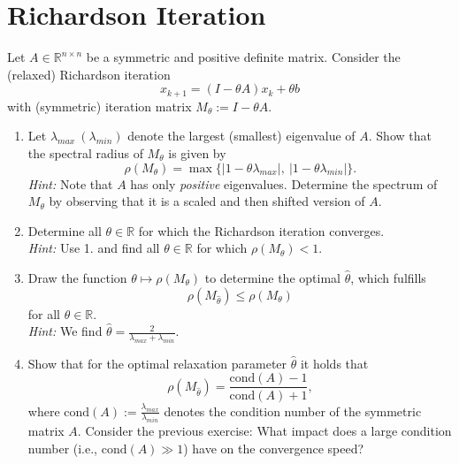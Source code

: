 \section{Richardson Iteration}
Let $A \in \mathbb{R}^{n\times n}$ be a symmetric and positive definite matrix.  Consider the (relaxed) Richardson iteration 
$$x_{k+1} = (I -  \theta A)x_k + \theta b $$
with (symmetric) iteration matrix $M_\theta := I-\theta A$.
\begin{enumerate}
	\item Let $\lambda_{max} ~(\lambda_{min})$ denote the largest (smallest) eigenvalue of $A$. Show that the spectral radius of $M_\theta$ is given by  $$\rho(M_\theta) = \max\{|1 - \theta \lambda_{max}|, ~|1 - \theta \lambda_{min}|\}.$$ 
	\textit{Hint:} Note that $A$ has only \textit{positive} eigenvalues. Determine the spectrum of $M_\theta$ by observing that it is a scaled and then shifted version of $A$.
	\item  Determine all $\theta \in \mathbb{R}$ for which the Richardson iteration converges.\\[0.1cm]
	\textit{Hint:} Use 1. and find all $\theta \in \mathbb{R}$ for which $\rho(M_\theta) < 1$.
	\item Draw the function $\theta \mapsto \rho(M_\theta)$ to determine the optimal $\hat{\theta}$, which fulfills
	$$\rho(M_{\hat{\theta}}) \leq  \rho(M_{\theta})$$
	for all $\theta \in \mathbb{R}$. \\[0.1cm]
	\textit{Hint: } We find $\hat{\theta} = \frac{2}{\lambda_{max} + \lambda_{min}}$.
	\item Show that for the optimal relaxation parameter $\hat{\theta}$ it holds that
	$$\rho(M_{\hat{\theta}}) = \frac{\text{cond}(A) -1}{\text{cond}(A) +1},$$
	where $\text{cond}(A) := \frac{\lambda_{max}}{\lambda_{min}}$ denotes the condition number of the symmetric matrix $A$. Consider the previous exercise: What impact does a large condition number (i.e., $\text{cond}(A) \gg 1$) have on the convergence speed?
\end{enumerate}

